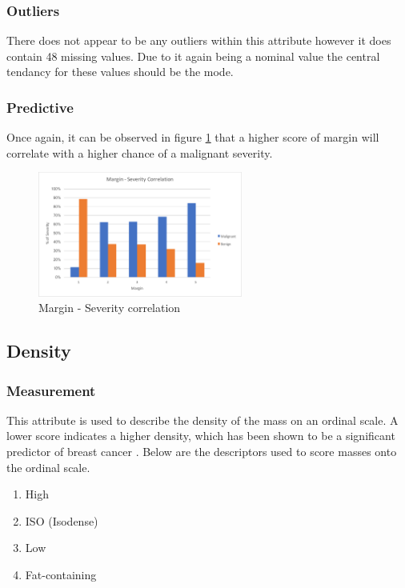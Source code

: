 \documentclass[12pt]{article}
\begin{document}
      \subsubsection{Outliers}
        There does not appear to be any outliers within this attribute however it does contain 48 missing values. Due to it again being a nominal value the central tendancy for these values should be the mode.

      \subsubsection{Predictive}
        Once again, it can be observed in figure \ref{fig:margin-severity-correlation} that a higher score of margin will correlate with a higher chance of a malignant severity.

        \begin{figure}[H]
          \centering
          \includegraphics[width=0.6\textwidth]{margin-severity-correlation}
          \caption{Margin - Severity correlation}
          \label{fig:margin-severity-correlation}
        \end{figure}

    \subsection{Density}
      \subsubsection{Measurement}
        This attribute is used to describe the density of the mass on an ordinal scale. A lower score indicates a higher density, which has been shown to be a significant predictor of breast cancer \citep{woods2011mammographic}. Below are the descriptors used to score masses onto the ordinal scale.

        \begin{enumerate}[label=\arabic*)]
          \item High
          \item ISO (Isodense)
          \item Low
          \item Fat-containing
        \end{enumerate}
\end{document}
